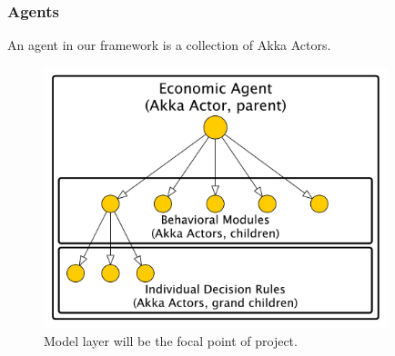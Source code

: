 \documentclass[11pt]{amsart}
\begin{document}
\subsubsection{Agents}
An agent in our framework is a collection of Akka Actors.
\begin{figure}[H]
\centering
\includegraphics[width=10cm]{img/hierarchical-actor.pdf}
\caption{Model layer will be the focal point of project.}
\end{figure}




\end{document}
